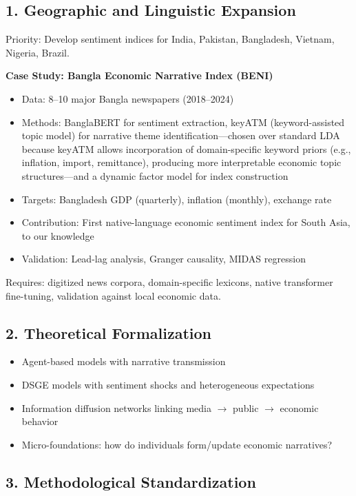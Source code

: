 \documentclass[11pt,twocolumn]{article}
\begin{document}
\subsection{1. Geographic and Linguistic Expansion}

Priority: Develop sentiment indices for India, Pakistan, Bangladesh, Vietnam, Nigeria, Brazil.

\textbf{Case Study: Bangla Economic Narrative Index (BENI)}
\begin{itemize}
\item Data: 8--10 major Bangla newspapers (2018--2024)
\item Methods: BanglaBERT for sentiment extraction, keyATM (keyword-assisted topic model) for narrative theme identification---chosen over standard LDA because keyATM allows incorporation of domain-specific keyword priors (e.g., inflation, import, remittance), producing more interpretable economic topic structures---and a dynamic factor model for index construction
\item Targets: Bangladesh GDP (quarterly), inflation (monthly), exchange rate
\item Contribution: First native-language economic sentiment index for South Asia, to our knowledge
\item Validation: Lead-lag analysis, Granger causality, MIDAS regression
\end{itemize}

Requires: digitized news corpora, domain-specific lexicons, native transformer fine-tuning, validation against local economic data.

\subsection{2. Theoretical Formalization}

\begin{itemize}
\item Agent-based models with narrative transmission
\item DSGE models with sentiment shocks and heterogeneous expectations  
\item Information diffusion networks linking media $\to$ public $\to$ economic behavior
\item Micro-foundations: how do individuals form/update economic narratives?
\end{itemize}

\subsection{3. Methodological Standardization}
\end{document}
